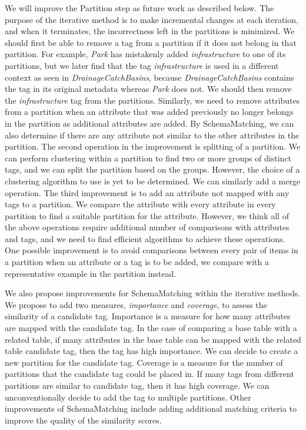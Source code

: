 We will improve the Partition step as future work as described below. The purpose of the iterative method is to make incremental changes at each iteration, and when it terminates, the incorrectness left in the partitions is minimized. We should first be able to remove a tag from a partition if it does not belong in that partition. For example, \textit{Park} has mistakenly added \textit{infrastructure} to one of its partitions, but we later find that the tag \textit{infrastructure} is used in a different context as seen in \textit{DrainageCatchBasins}, because \textit{DrainageCatchBasins} contains the tag in its original metadata whereas \textit{Park} does not. We should then remove the \textit{infrastructure} tag from the partitions. Similarly, we need to remove attributes from a partition when an attribute that was added previously no longer belongs in the partition as additional attributes are added. By SchemaMatching, we can also determine if there are any attribute not similar to the other attributes in the partition. The second operation in the improvement is splitting of a partition. We can perform clustering within a partition to find two or more groups of distinct tags, and we can split the partition based on the groups. However, the choice of a clustering algorithm to use is yet to be determined. We can similarly add a merge operation. The third improvement is to add an attribute not mapped with any tags to a partition. We compare the attribute with every attribute in every partition to find a suitable partition for the attribute. However, we think all of the above operations require additional number of comparisons with attributes and tags, and we need to find efficient algorithms to achieve these operations. One possible improvement is to avoid comparisons between every pair of items in a partition when an attribute or a tag is to be added, we compare with a representative example in the partition instead.

We also propose improvements for SchemaMatching within the iterative methods. We propose to add two measures, \textit{importance} and \textit{coverage}, to assess the similarity of a candidate tag. Importance is a measure for how many attributes are mapped with the candidate tag. In the case of comparing a base table with a related table, if many attributes in the base table can be mapped with the related table candidate tag, then the tag has high importance. We can decide to create a new partition for the candidate tag. Coverage is a measure for the number of partitions that the candidate tag could be placed in. If many tags from different partitions are similar to candidate tag, then it has high coverage. We can unconventionally decide to add the tag to multiple partitions. Other improvements of SchemaMatching include adding additional matching criteria to improve the quality of the similarity scores.

